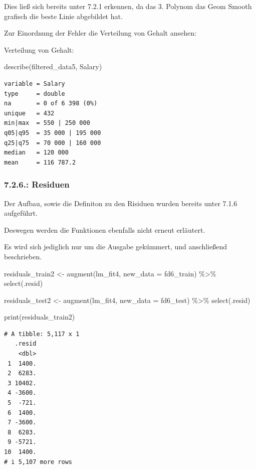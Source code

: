\documentclass[
  letterpaper,
  DIV=11,
  numbers=noendperiod]{scrartcl}
\newenvironment{Shaded}{\begin{snugshade}}{\end{snugshade}}
\newcommand{\AttributeTok}[1]{\textcolor[rgb]{0.40,0.45,0.13}{#1}}
\newcommand{\FunctionTok}[1]{\textcolor[rgb]{0.28,0.35,0.67}{#1}}
\newcommand{\NormalTok}[1]{\textcolor[rgb]{0.00,0.23,0.31}{#1}}
\newcommand{\OtherTok}[1]{\textcolor[rgb]{0.00,0.23,0.31}{#1}}
\newcommand{\SpecialCharTok}[1]{\textcolor[rgb]{0.37,0.37,0.37}{#1}}
\begin{document}
Dies ließ sich bereits unter 7.2.1 erkennen, da das 3. Polynom das Geom
Smooth grafisch die beste Linie abgebildet hat.

Zur Einordnung der Fehler die Verteilung von Gehalt ansehen:

Verteilung von Gehalt:

\begin{Shaded}
\begin{Highlighting}[]
\FunctionTok{describe}\NormalTok{(filtered\_data5, Salary)}
\end{Highlighting}
\end{Shaded}

\begin{verbatim}
variable = Salary
type     = double
na       = 0 of 6 398 (0%)
unique   = 432
min|max  = 550 | 250 000
q05|q95  = 35 000 | 195 000
q25|q75  = 70 000 | 160 000
median   = 120 000
mean     = 116 787.2
\end{verbatim}

\hypertarget{residuen-1}{%
\subsubsection{7.2.6.: Residuen}\label{residuen-1}}

Der Aufbau, sowie die Definiton zu den Risiduen wurden bereits unter
7.1.6 aufgeführt.

Deswegen werden die Funktionen ebenfalls nicht erneut erläutert.

Es wird sich jediglich nur um die Ausgabe gekümmert, und anschließend
beschrieben.

\begin{Shaded}
\begin{Highlighting}[]
\NormalTok{residuals\_train2 }\OtherTok{\textless{}{-}} \FunctionTok{augment}\NormalTok{(lm\_fit4, }\AttributeTok{new\_data =}\NormalTok{ fd6\_train) }\SpecialCharTok{\%\textgreater{}\%} \FunctionTok{select}\NormalTok{(.resid)}

\NormalTok{residuals\_test2 }\OtherTok{\textless{}{-}} \FunctionTok{augment}\NormalTok{(lm\_fit4, }\AttributeTok{new\_data =}\NormalTok{ fd6\_test) }\SpecialCharTok{\%\textgreater{}\%} \FunctionTok{select}\NormalTok{(.resid)}

\FunctionTok{print}\NormalTok{(residuals\_train2)}
\end{Highlighting}
\end{Shaded}

\begin{verbatim}
# A tibble: 5,117 x 1
   .resid
    <dbl>
 1  1400.
 2  6283.
 3 10402.
 4 -3600.
 5  -721.
 6  1400.
 7 -3600.
 8  6283.
 9 -5721.
10  1400.
# i 5,107 more rows
\end{verbatim}
\end{document}

